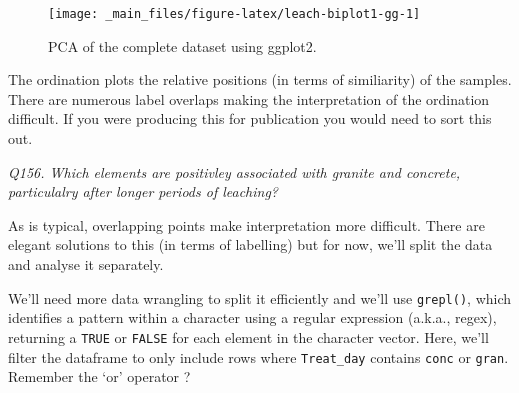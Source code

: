 \documentclass[
  11pt,
  a4paper,
]{book}
\newenvironment{Shaded}{\begin{snugshade}}{\end{snugshade}}
\newcommand{\AttributeTok}[1]{\textcolor[rgb]{0.77,0.63,0.00}{#1}}
\newcommand{\ConstantTok}[1]{\textcolor[rgb]{0.00,0.00,0.00}{#1}}
\newcommand{\DecValTok}[1]{\textcolor[rgb]{0.00,0.00,0.81}{#1}}
\newcommand{\FunctionTok}[1]{\textcolor[rgb]{0.00,0.00,0.00}{#1}}
\newcommand{\NormalTok}[1]{#1}
\newcommand{\SpecialCharTok}[1]{\textcolor[rgb]{0.00,0.00,0.00}{#1}}
\newcommand{\StringTok}[1]{\textcolor[rgb]{0.31,0.60,0.02}{#1}}
\begin{document}
\begin{Shaded}
\end{Shaded}

\begin{figure}

{\centering \texttt{[image: \_main\_files/figure-latex/leach-biplot1-gg-1]} 

}

\caption{PCA of the complete dataset using ggplot2.}\label{fig:leach-biplot1-gg}
\end{figure}

The ordination plots the relative positions (in terms of similiarity) of the samples. There are numerous label overlaps making the interpretation of the ordination difficult. If you were producing this for publication you would need to sort this out.

\emph{Q156. Which elements are positivley associated with granite and concrete, particulalry after longer periods of leaching?}

As is typical, overlapping points make interpretation more difficult. There are elegant solutions to this (in terms of labelling) but for now, we'll split the data and analyse it separately.

We'll need more data wrangling to split it efficiently and we'll use \texttt{grepl()}, which identifies a pattern within a character using a regular expression (a.k.a., regex), returning a \texttt{TRUE} or \texttt{FALSE} for each element in the character vector. Here, we'll filter the dataframe to only include rows where \texttt{Treat\_day} contains \texttt{conc} or \texttt{gran}. Remember the `or' operator \texttt{\textbar{}}?
\end{document}
